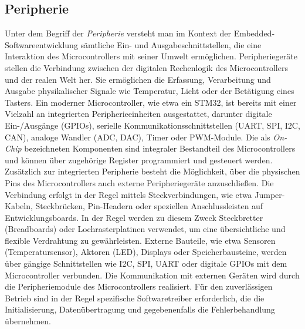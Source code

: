 \subsection{Peripherie}
Unter dem Begriff der \emph{Peripherie} versteht man im Kontext der Embedded-Softwareentwicklung sämtliche Ein- und Ausgabeschnittstellen, die eine Interaktion des Microcontrollers mit seiner Umwelt ermöglichen.
Peripheriegeräte stellen die Verbindung zwischen der digitalen Rechenlogik des Microcontrollers und der realen Welt her.
Sie ermöglichen die Erfassung, Verarbeitung und Ausgabe physikalischer Signale wie Temperatur, Licht oder der Betätigung eines Tasters.
Ein moderner Microcontroller, wie etwa ein STM32, ist bereits mit einer Vielzahl an integrierten Peripherieeinheiten ausgestattet, darunter digitale Ein-/Ausgänge (GPIOs), serielle Kommunikationsschnittstellen (UART, SPI, I2C, CAN), analoge Wandler (ADC, DAC), Timer oder PWM-Module. 
Die als \emph{On-Chip} bezeichneten Komponenten sind integraler Bestandteil des Microcontrollers und können über zugehörige Register programmiert und gesteuert werden.
Zusätzlich zur integrierten Peripherie besteht die Möglichkeit, über die physischen Pins des Microcontrollers auch externe Peripheriegeräte anzuschließen. 
Die Verbindung erfolgt in der Regel mittels Steckverbindungen, wie etwa Jumper-Kabeln, Steckbrücken, Pin-Headern oder speziellen Anschlussleisten auf Entwicklungsboards. 
In der Regel werden zu diesem Zweck Steckbretter (Breadboards) oder Lochrasterplatinen verwendet, um eine übersichtliche und flexible Verdrahtung zu gewährleisten. 
Externe Bauteile, wie etwa Sensoren (Temperatursensor), Aktoren (LED), Displays oder Speicherbausteine, werden über gängige Schnittstellen wie I2C, SPI, UART oder digitale GPIOs mit dem Microcontroller verbunden.
Die Kommunikation mit externen Geräten wird durch die Peripheriemodule des Microcontrollers realisiert. 
Für den zuverlässigen Betrieb sind in der Regel spezifische Softwaretreiber erforderlich, die die Initialisierung, Datenübertragung und gegebenenfalls die Fehlerbehandlung übernehmen.

